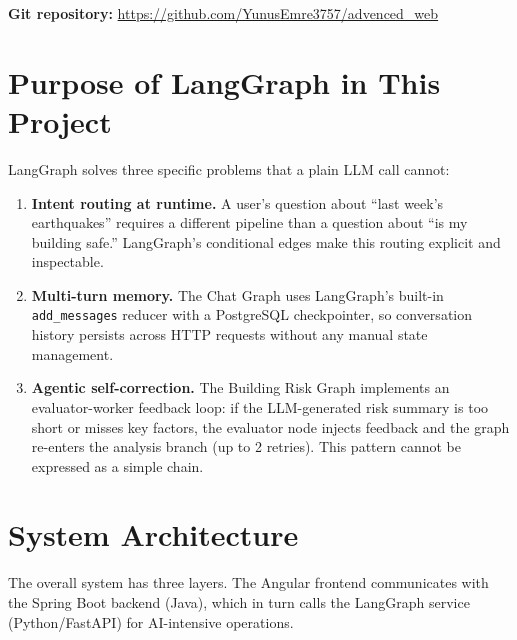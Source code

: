 \documentclass[11pt,a4paper]{article}
\begin{document}
\noindent\textbf{Git repository:} \url{https://github.com/YunusEmre3757/advenced_web}

\section{Purpose of LangGraph in This Project}

LangGraph solves three specific problems that a plain LLM call cannot:

\begin{enumerate}[leftmargin=1.5em]
    \item \textbf{Intent routing at runtime.} A user's question about ``last week's earthquakes'' requires a different pipeline than a question about ``is my building safe.'' LangGraph's conditional edges make this routing explicit and inspectable.

    \item \textbf{Multi-turn memory.} The Chat Graph uses LangGraph's built-in \texttt{add\_messages} reducer with a PostgreSQL checkpointer, so conversation history persists across HTTP requests without any manual state management.

    \item \textbf{Agentic self-correction.} The Building Risk Graph implements an evaluator-worker feedback loop: if the LLM-generated risk summary is too short or misses key factors, the evaluator node injects feedback and the graph re-enters the analysis branch (up to 2 retries). This pattern cannot be expressed as a simple chain.
\end{enumerate}

\section{System Architecture}

The overall system has three layers. The Angular frontend communicates with the Spring Boot backend (Java), which in turn calls the LangGraph service (Python/FastAPI) for AI-intensive operations.
\end{document}
